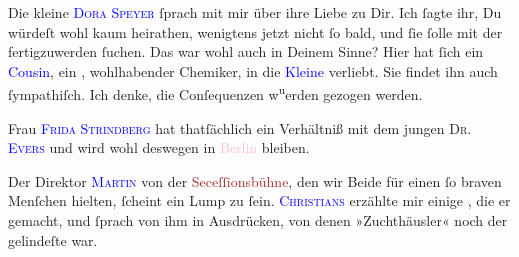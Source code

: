 \pstart
           Die kleine \textsc{\textcolor{blue}{Dora Speyer}{}\ledrightnote{\textcolor{blue}{Dora Michaelis}}} ſprach mit mir über ihre Liebe zu Dir. Ich ſagte ihr, Du würdeſt wohl kaum
               heirathen, wenigtens jetzt nicht ſo bald, und ſie ſolle mit der {\pb}\label{K_L03063-3v}\label{K_L03063-3h} fertigzuwerden ſuchen. Das war wohl auch in Deinem Sinne? Hier hat ſich ein
                  \textcolor{blue}{Cousin}{}\ledrightnote{{$\rightarrow$}\textcolor{blue}{Karl Michaelis}}, ein \label{K_L03063-444v}\label{K_L03063-444h},
               wohlhabender Chemiker, in die \textcolor{blue}{Kleine}{}\ledrightnote{{$\rightarrow$}\textcolor{blue}{Dora Michaelis}} verliebt. Sie findet ihn auch ſympathiſch. Ich denke, die
               Conſequenzen w\substVorne{}\textsuperscript{u}\substDazwischen{}e\substHinten{}rden \strikeout{\textcolor{gray}{end}} gezogen werden.\pend
           
\pstart
           Frau \textsc{\textcolor{blue}{Frida Strindberg}{}\ledrightnote{\textcolor{blue}{Frida Strindberg}}} hat thatſächlich ein Verhältniß mit dem jungen \textsc{Dr. \textcolor{blue}{Evers}{}\ledrightnote{\textcolor{blue}{Hanns Heinz Ewers}}} und wird wohl deswegen in \textcolor{pink}{Berlin}{}\ledrightnote{\textcolor{pink}{Berlin}} bleiben.\pend
           
\pstart
           Der Direktor \textsc{\textcolor{blue}{Martin}{}\ledrightnote{\textcolor{blue}{Paul Martin Marton}}} von der {\pb}\textcolor{brown}{Seceſſionsbühne}{}\ledrightnote{\textcolor{brown}{Secessionsbühne}}, den wir Beide für einen ſo
               braven Menſchen hielten, ſcheint ein Lump zu ſein. \textsc{\textcolor{blue}{Christians}{}\ledrightnote{\textcolor{blue}{Rudolf Christians}}} erzählte mir einige \label{K_L03063-5v}\label{K_L03063-5h},
               die er gemacht, und ſprach von ihm in Ausdrücken, von denen »Zuchthäusler« noch der
               gelindeſte war.\pend
           
